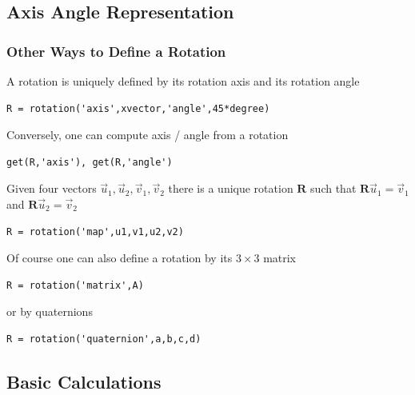 \documentclass[compress]{beamer}
\begin{document}
\subsection*{Axis Angle Representation}
\label{sec:axis-angle-repr}

\begin{frame}[fragile]
  \frametitle{Other Ways to Define a Rotation}

  A rotation is uniquely defined by its rotation axis and its rotation angle

  \begin{lstlisting}[style=input]
R = rotation('axis',xvector,'angle',45*degree)
  \end{lstlisting}

  \pause
  \medskip

  Conversely, one can compute axis / angle from a rotation

  \begin{lstlisting}[style=input]
get(R,'axis'), get(R,'angle')
  \end{lstlisting}

  \pause
  \medskip

Given four vectors $\vec u_{1}, \vec u_{2}, \vec v_{1}, \vec v_{2}$ there is a
unique rotation $\mathbf R$ such that  $\mathbf R \vec u_{1} = \vec v_{1}$ and
$\mathbf R \vec u_{2} = \vec v_{2}$

\begin{lstlisting}[style=input]
R = rotation('map',u1,v1,u2,v2)
\end{lstlisting}

  \pause
  \medskip

Of course one can also define a rotation by its $3 \times 3$ matrix

  \begin{lstlisting}[style=input]
R = rotation('matrix',A)
  \end{lstlisting}

or by quaternions

  \begin{lstlisting}[style=input]
R = rotation('quaternion',a,b,c,d)
  \end{lstlisting}

\end{frame}

\subsection*{Basic Calculations}
\label{sec:euler-angles}
\end{document}
